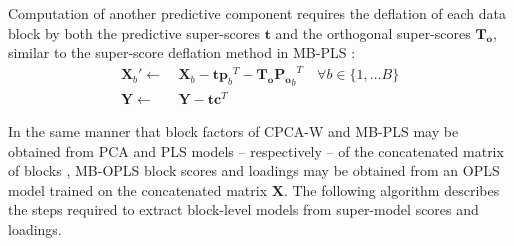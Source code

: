\begin{algorithm}[H]
\end{algorithm}
\newpage

\begin{doublespace}
Computation of another predictive component requires the deflation of each
data block by both the predictive super-scores $$ and the
orthogonal super-scores $$, similar to the super-score deflation
method in MB-PLS \cite{westerhuis:jchemo1997}:
\begin{align}
\mathbf{X}_b' \gets& \: \mathbf{X}_b -
 \mathbf{t} {\mathbf{p}_b}^T -
 \mathbf{T_o} {\mathbf{P_o}_b}^T
 \quad \forall b \in \{1, \dots B\} \\
\mathbf{Y} \gets& \: \mathbf{Y} - \mathbf{t} \mathbf{c}^T
\end{align}

In the same manner that block factors of CPCA-W and MB-PLS may be obtained from
PCA and PLS models -- respectively -- of the concatenated matrix of blocks
\cite{westerhuis:jchemo1998,smilde:jchemo2003}, MB-OPLS block scores and
loadings may be obtained from an OPLS model trained on the concatenated
matrix $$. The following algorithm describes the steps required
to extract block-level models from super-model scores and loadings.
\end{doublespace}

